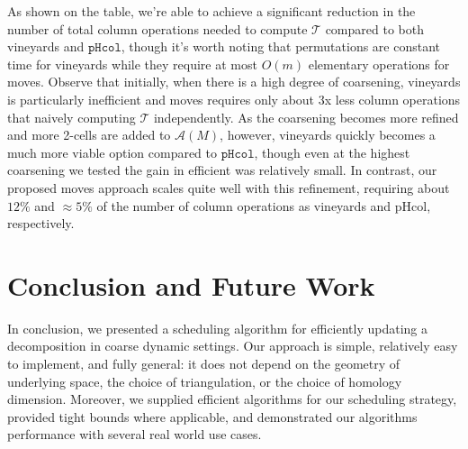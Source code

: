 \documentclass{article} %
\begin{document}
\noindent
As shown on the table, we're able to achieve a significant reduction in the number of total column operations needed to compute $\mathcal{T}$ compared to both vineyards and $\mathtt{pHcol}$, though it's worth noting that permutations are constant time for vineyards while they require at most $O(m)$ elementary operations for moves. Observe that initially, when there is a high degree of coarsening, vineyards is particularly inefficient and moves requires only about 3x less column operations that naively computing $\mathcal{T}$ independently. As the coarsening becomes more refined and more 2-cells are added to $\mathcal{A}(M)$, however, vineyards quickly becomes a much more viable option compared to $\mathtt{pHcol}$, though even at the highest coarsening we tested the gain in efficient was relatively small. In contrast, our proposed moves approach scales quite well with this refinement, requiring about $12\%$  and $\approx 5\%$ of the number of column operations as vineyards and $\mathrm{pHcol}$, respectively. 






\section{Conclusion and Future Work}\label{sec:conclusion}
In conclusion, we presented a scheduling algorithm for efficiently updating a decomposition in coarse dynamic settings. Our approach is simple, relatively easy to implement, and fully general: it does not depend on the geometry of underlying space, the choice of triangulation, or the choice of homology dimension. Moreover, we supplied efficient algorithms for our scheduling strategy, provided tight bounds where applicable, and demonstrated our algorithms performance with several real world use cases.
\end{document}
